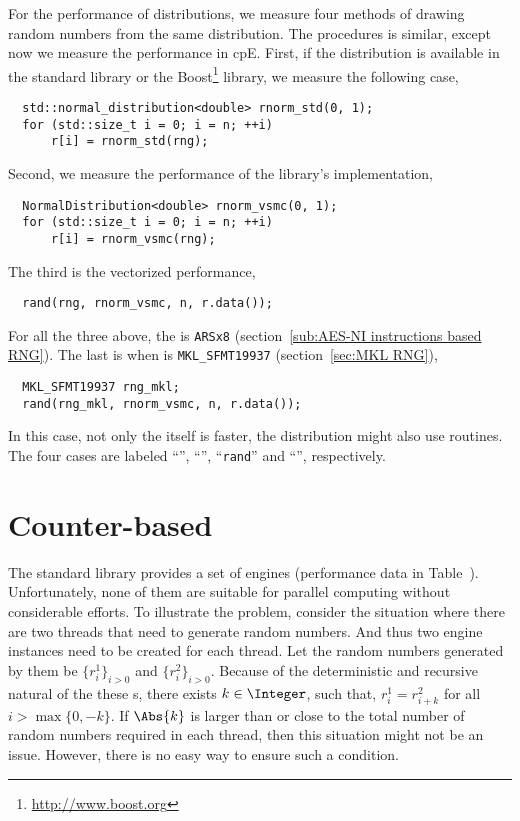 For the performance of distributions, we measure four methods of drawing random
numbers from the same distribution. The procedures is similar, except now we
measure the performance in cpE. First, if the distribution is available in the
standard library or the Boost\footnote{\url{http://www.boost.org}} library, we
measure the following case,
\begin{Verbatim}
  std::normal_distribution<double> rnorm_std(0, 1);
  for (std::size_t i = 0; i = n; ++i)
      r[i] = rnorm_std(rng);
\end{Verbatim}
Second, we measure the performance of the library's implementation,
\begin{Verbatim}
  NormalDistribution<double> rnorm_vsmc(0, 1);
  for (std::size_t i = 0; i = n; ++i)
      r[i] = rnorm_vsmc(rng);
\end{Verbatim}
The third is the vectorized performance,
\begin{Verbatim}
  rand(rng, rnorm_vsmc, n, r.data());
\end{Verbatim}
For all the three above, the \rng is \verb|ARSx8| (section~\ref{sub:AES-NI
  instructions based RNG}). The last is when \rng is \verb|MKL_SFMT19937|
(section~\ref{sec:MKL RNG}),
\begin{Verbatim}
  MKL_SFMT19937 rng_mkl;
  rand(rng_mkl, rnorm_vsmc, n, r.data());
\end{Verbatim}
In this case, not only the \rng itself is faster, the distribution might also
use \mkl routines. The four cases are labeled ``\std'', ``\vsmc'',
``\verb|rand|'' and ``\mkl'', respectively.

\section{Counter-based \protect\rng}
\label{sec:Counter-based RNG}

The standard library provides a set of \rng engines (performance data in
Table~). Unfortunately, none of
them are suitable for parallel computing without considerable efforts. To
illustrate the problem, consider the situation where there are two threads that
need to generate random numbers. And thus two \rng engine instances need to be
created for each thread. Let the random numbers generated by them be
$\{r_i^1\}_{i>0}$ and $\{r_i^2\}_{i>0}$. Because of the deterministic and
recursive natural of the these \rng{}s, there exists $k\in\Integer$, such that,
$r_i^1 = r_{i + k}^2$ for all $i > \max\{0, -k\}$. If $\Abs{k}$ is larger than
or close to the total number of random numbers required in each thread, then
this situation might not be an issue. However, there is no easy way to ensure
such a condition.

